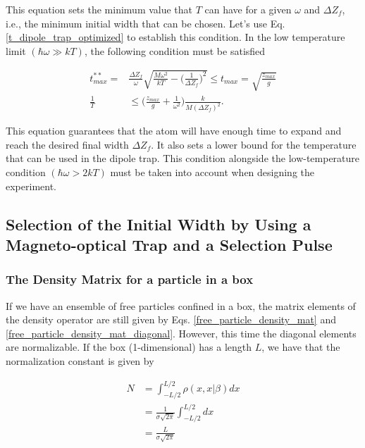 \documentclass{article}
\begin{document}
This equation sets the minimum value that $T$ can have for a given $\omega$ and $\Delta Z_{f}$, i.e., the minimum initial width that can be chosen. Let's use Eq. \ref{t_dipole_trap_optimized} to establish this condition. In the low temperature limit $(\hbar \omega \gg kT)$, the following condition must be satisfied

\begin{equation}\label{dipole_trap_temperature_length_condition}
\begin{split}
    t^{**}_{max} = & \frac{\Delta Z_{f}}{\omega} \sqrt{\frac{M \omega^{2}}{kT} - \bigg(\frac{1}{\Delta Z_{f}}\bigg)^{2}} \le t_{max} = \sqrt{\frac{z_{max}}{g}} \\
    \frac{1}{T} & \le \bigg( \frac{z_{max}}{g} + \frac{1}{\omega^{2}} \bigg) \frac{k}{M (\Delta Z_{f})^{2}}.
\end{split}
\end{equation}

This equation guarantees that the atom will have enough time to expand and reach the desired final width $\Delta Z_{f}$. It also sets a lower bound for the temperature that can be used in the dipole trap. This condition alongside the low-temperature condition $(\hbar \omega > 2kT)$ must be taken into account when designing the experiment.

\subsection{Selection of the Initial Width by Using a Magneto-optical Trap and a Selection Pulse}

\subsubsection{The Density Matrix for a particle in a box}
If we have an ensemble of free particles confined in a box, the matrix elements of the density operator are still given by Eqs. \ref{free_particle_density_mat} and \ref{free_particle_density_mat_diagonal}. However, this time the diagonal elements are normalizable. If the box (1-dimensional) has a length $L$, we have that the normalization constant is given by

\begin{equation}
   \begin{split}
        N & = \int_{-L/2}^{L/2} \rho(x, x | \beta) dx \\ & = \frac{1}{\sigma \sqrt{2\pi}} \int_{-L/2}^{L/2} dx \\ & = \frac{L}{\sigma \sqrt{2\pi}}
   \end{split}
\end{equation}
\end{document}
